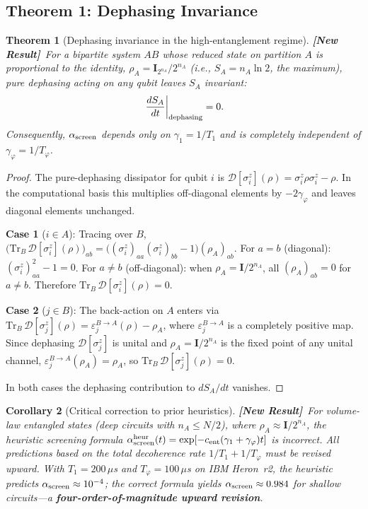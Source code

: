 \documentclass[12pt]{article}
\newtheorem{theorem}{Theorem}
\newtheorem{corollary}[theorem]{Corollary}
\newcommand{\newresult}{\textbf{[New Result]}}
\begin{document}
\subsection{Theorem 1: Dephasing Invariance}

\begin{theorem}[Dephasing invariance in the high-entanglement regime]
\label{thm:dephasing}
\newresult\ For a bipartite system $AB$ whose reduced state on partition $A$ is
proportional to the identity, $\rho_A = \mathbf{I}_{2^{n_A}}/2^{n_A}$
(i.e., $S_A = n_A\ln 2$, the maximum), pure dephasing acting on any qubit
leaves $S_A$ invariant:
\begin{equation}
\left.\frac{dS_A}{dt}\right|_{\rm dephasing} = 0.
\label{eq:dephasing_invariance}
\end{equation}
Consequently, $\alpha_{\rm screen}$ depends only on $\gamma_1 = 1/T_1$ and is
completely independent of $\gamma_\varphi = 1/T_\varphi$.
\end{theorem}

\begin{proof}
The pure-dephasing dissipator for qubit $i$ is
$\mathcal{D}[\sigma_i^z](\rho) = \sigma_i^z\rho\sigma_i^z - \rho$.
In the computational basis this multiplies off-diagonal elements by $-2\gamma_\varphi$
and leaves diagonal elements unchanged.

\textbf{Case 1} ($i\in A$): Tracing over $B$,
$\bigl(\mathrm{Tr}_B\,\mathcal{D}[\sigma_i^z](\rho)\bigr)_{ab}
= \bigl((\sigma_i^z)_{aa}(\sigma_i^z)_{bb}-1\bigr)(\rho_A)_{ab}$.
For $a=b$ (diagonal): $(\sigma_i^z)^2_{aa}-1=0$.
For $a\ne b$ (off-diagonal): when $\rho_A = \mathbf{I}/2^{n_A}$, all
$(\rho_A)_{ab} = 0$ for $a\ne b$. Therefore $\mathrm{Tr}_B\,\mathcal{D}[\sigma_i^z](\rho) = 0$.

\textbf{Case 2} ($j\in B$): The back-action on $A$ enters via
$\mathrm{Tr}_B\,\mathcal{D}[\sigma_j^z](\rho) = \varepsilon^{B\to A}_j(\rho) - \rho_A$,
where $\varepsilon^{B\to A}_j$ is a completely positive map. Since dephasing
$\mathcal{D}[\sigma_j^z]$ is unital and $\rho_A = \mathbf{I}/2^{n_A}$ is the fixed
point of any unital channel, $\varepsilon^{B\to A}_j(\rho_A) = \rho_A$, so
$\mathrm{Tr}_B\,\mathcal{D}[\sigma_j^z](\rho) = 0$.

In both cases the dephasing contribution to $dS_A/dt$ vanishes.
\end{proof}

\begin{corollary}[Critical correction to prior heuristics]
\label{cor:correction}
\newresult\ For volume-law entangled states (deep circuits with $n_A \le N/2$),
where $\rho_A \approx \mathbf{I}/2^{n_A}$, the heuristic screening formula
$\alpha_{\rm screen}^{\rm heur}(t) = \exp[-c_{\rm ent}(\gamma_1+\gamma_\varphi)t]$
is incorrect. All predictions based on the total decoherence rate
$1/T_1 + 1/T_\varphi$ must be revised upward. With $T_1 = 200\,\mu$s and
$T_\varphi = 100\,\mu$s on IBM Heron~r2, the heuristic predicts
$\alpha_{\rm screen}\approx 10^{-4}$; the correct formula yields
$\alpha_{\rm screen}\approx 0.984$ for shallow circuits---a \textbf{four-order-of-magnitude
upward revision}.
\end{corollary}
\end{document}
